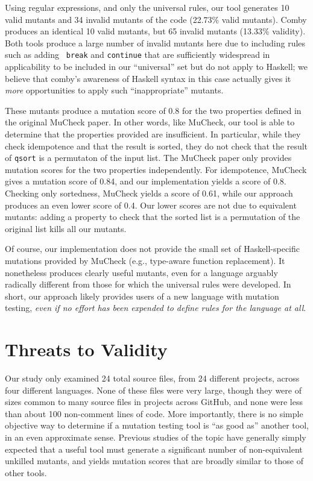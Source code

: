 \documentclass[sigconf,review, anonymous]{acmart}
\begin{document}
{Using regular expressions, and only the universal rules, our tool
generates 10 valid mutants and 34 invalid mutants of the code (22.73\%
valid mutants).  Comby produces an identical 10 valid mutants, but 65
invalid mutants (13.33\% validity).  Both tools produce a large number
of invalid mutants here due to including rules such as adding {\tt
  break} and {\tt continue} that are sufficiently widespread in
applicability to be included in our ``universal'' set but do not apply
to Haskell; we believe that comby's awareness of Haskell syntax in
this case actually gives it \emph{more} opportunities to apply such
``inappropriate'' mutants.

These mutants produce a mutation
score of 0.8 for the two properties defined in the original MuCheck
paper.  In other words, like MuCheck, our tool is able to
determine that the properties provided are insufficient.  In
particular, while they check idempotence and that the result is
sorted, they do not check that the result of {\tt qsort} is a permutaton of the input
list.  The MuCheck paper only provides mutation scores for the two
properties independently.  For idempotence, MuCheck gives a mutation
score of 0.84, and our implementation yields a score of 0.8.  Checking
only sortedness, MuCheck yields a score of 0.61, while our approach
produces an even lower score of 0.4.  Our lower
scores are not due to equivalent mutants: adding a property to check
that the sorted list is a permutation of the original list kills all
our mutants.

Of course, our implementation does not provide the small set of Haskell-specific
mutations provided by MuCheck (e.g., type-aware function replacement).  It nonetheless produces clearly useful
mutants, even for a language arguably radically different from those
for which the universal rules were developed.  In short, our approach
likely provides users of a new language with mutation testing,
\emph{even if no effort has been expended to define rules for the
  language at all}.

\section{Threats to Validity}

Our study only examined 24 total source files, from 24 different projects, across four different
languages.  None of these files were very large, though they were of
sizes common to many source files in projects across GitHub, and none
were less than about 100 non-comment lines of code.  More importantly,
there is no simple objective way to determine if a mutation testing
tool is ``as good as'' another tool, in an even approximate sense.
Previous studies of the topic have generally simply expected that a
useful tool must
generate a significant number of non-equivalent unkilled mutants, and
yields mutation scores that are broadly similar to those of other tools.


}
\end{document}
